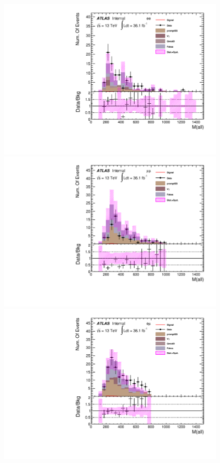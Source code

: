 \begin{figure}[h]
\begin{minipage}[t]{0.33\linewidth}
 \centering
 \includegraphics[width=1.0\textwidth,angle=-90]{fig/SigOpt/mH300_m_all_ee.pdf}
 \end{minipage}
 \begin{minipage}[t]{0.33\linewidth}
 \centering
 \includegraphics[width=1.0\textwidth,angle=-90]{fig/SigOpt/mH300_m_all_mumu.pdf}
 \end{minipage}
 \begin{minipage}[t]{0.33\linewidth}
 \centering
 \includegraphics[width=1.0\textwidth,angle=-90]{fig/SigOpt/mH300_m_all_emu.pdf}

\end{minipage}
\end{figure}
